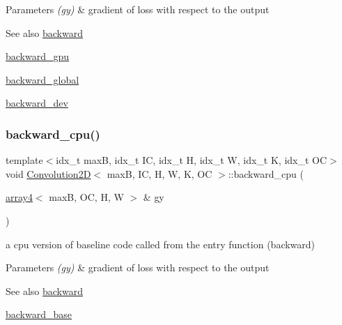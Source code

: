\begin{DoxyParams}{Parameters}
{\em (gy)} & gradient of loss with respect to the output \\
\hline
\end{DoxyParams}
\begin{DoxySeeAlso}{See also}
\hyperlink{structConvolution2D_ace928f0589a42b6505f5787652ffbacd}{backward} 

\hyperlink{structConvolution2D_af7105f910c11a7bd93e27a7abc06e502}{backward\+\_\+gpu} 

\hyperlink{softmaxcrossentropy_8h_a47d56a9a23e08247b227f4aac17413e0}{backward\+\_\+global} 

\hyperlink{structConvolution2D_a144c8af173f1cbb9e7efade3b2f19f1e}{backward\+\_\+dev} 
\end{DoxySeeAlso}
\mbox{\label{structConvolution2D_a8b9838267f044544073f95a278304f06}} 
\subsubsection{\texorpdfstring{backward\+\_\+cpu()}{backward\_cpu()}}
{\footnotesize\ttfamily template$<$idx\+\_\+t maxB, idx\+\_\+t IC, idx\+\_\+t H, idx\+\_\+t W, idx\+\_\+t K, idx\+\_\+t OC$>$ \\
void \hyperlink{structConvolution2D}{Convolution2D}$<$ maxB, IC, H, W, K, OC $>$\+::backward\+\_\+cpu (\begin{DoxyParamCaption}\item[{\hyperlink{structarray4}{array4}$<$ maxB, OC, H, W $>$ \&}]{gy }\end{DoxyParamCaption})\hspace{0.3cm}{\ttfamily [inline]}}



a cpu version of baseline code called from the entry function (backward) 


\begin{DoxyParams}{Parameters}
{\em (gy)} & gradient of loss with respect to the output \\
\hline
\end{DoxyParams}
\begin{DoxySeeAlso}{See also}
\hyperlink{structConvolution2D_ace928f0589a42b6505f5787652ffbacd}{backward} 

\hyperlink{structConvolution2D_af202e85ae6c5aa5e4aae6869a8891fc3}{backward\+\_\+base} 
\end{DoxySeeAlso}
\mbox{\label{structConvolution2D_a144c8af173f1cbb9e7efade3b2f19f1e}} 

